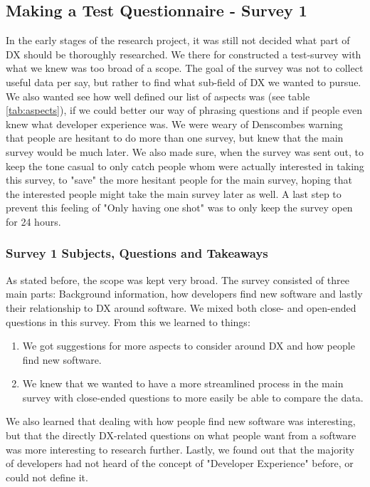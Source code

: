 \documentclass{cslthse-msc}
\begin{document}
    \subsection{Making a Test Questionnaire - Survey 1}
    In the early stages of the research project, it was still not decided what part of DX should be thoroughly researched.
    We there for constructed a test-survey with what we knew was too broad of a scope. The goal of the survey was not to collect
    useful data per say, but rather to find what sub-field of DX we wanted to pursue. We also wanted see how well defined our list of aspects was (see table \ref{tab:aspects}), if we could better our way of phrasing questions and if people even knew what developer experience was. We were weary of Denscombes warning that people are hesitant to do more than one survey, but knew that the main survey would be much later. We also made sure, when the survey was sent out, to keep the tone casual to only catch people whom were actually interested in taking this survey, to "save" the more hesitant people for the main survey, hoping that the interested people might take the main survey later as well. A last step to prevent this feeling of "Only having one shot" was to only keep the survey open for 24 hours.

    \subsubsection{Survey 1 Subjects, Questions and Takeaways}
    As stated before, the scope was kept very broad. The survey consisted of three main parts: Background information, how developers find new software and lastly their relationship to DX around software. We mixed both close- and open-ended questions in this survey. From this we learned to things:
    \begin{enumerate}
        \item We got suggestions for more aspects to consider around DX and how people find new software.
        \item We knew that we wanted to have a more streamlined process in the main survey with close-ended questions to more easily be able to compare the data.
    \end{enumerate}

    We also learned that dealing with how people find new software was interesting, but that the directly DX-related questions on what people want from a software was more interesting to research further. Lastly, we found out that the majority of developers had not heard of the concept of "Developer Experience" before, or could not define it.
\end{document}
